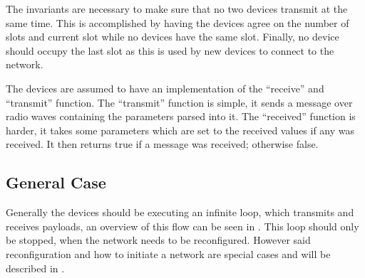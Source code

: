The invariants are necessary to make sure that no two devices transmit at the same time. 
This is accomplished by having the devices agree on the number of slots and current slot while no devices have the same slot. 
Finally, no device should occupy the last slot as this is used by new devices to connect to the network.

The devices are assumed to have an implementation of the \enquote{receive} and \enquote{transmit} function.
The \enquote{transmit} function is simple, it sends a message over radio waves containing the parameters parsed into it.
The \enquote{received} function is harder, it takes some parameters which are set to the received values if any was received. 
It then returns true if a message was received; otherwise false.
                    
\subsection{General Case} %
\label{sub:general_case}
Generally the devices should be executing an infinite loop, which transmits and receives payloads, an overview of this flow can be seen in .
This loop should only be stopped, when the network needs to be reconfigured.
However said reconfiguration and how to initiate a network are special cases and will be described in .


